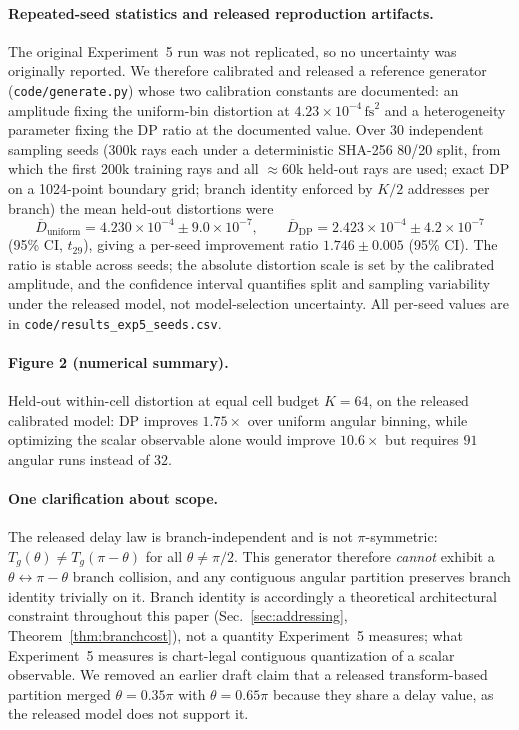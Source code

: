 \documentclass[11pt]{article}
\begin{document}
\paragraph{Repeated-seed statistics and released reproduction artifacts.}
The original Experiment~5 run was not replicated, so no uncertainty was originally
reported. We therefore calibrated and released a reference generator
(\texttt{code/generate.py}) whose two calibration constants are documented: an
amplitude fixing the uniform-bin distortion at $4.23\times10^{-4}\,\mathrm{fs}^2$ and a
heterogeneity parameter fixing the DP ratio at the documented value. Over $30$
independent sampling seeds (300k rays each under a deterministic SHA-256 80/20 split,
from which the first 200k training rays and all $\approx60$k held-out rays are used; exact
DP on a 1024-point boundary grid; branch identity enforced by $K/2$ addresses per
branch) the mean held-out distortions were
\begin{equation}
\overline{D}_{\mathrm{uniform}} = 4.230\times10^{-4} \pm 9.0\times10^{-7},
\qquad
\overline{D}_{\mathrm{DP}} = 2.423\times10^{-4} \pm 4.2\times10^{-7}
\end{equation}
(95\% CI, $t_{29}$), giving a per-seed improvement ratio
$\mathbf{1.746 \pm 0.005}$ (95\% CI). The ratio is stable across seeds; the absolute
distortion scale is set by the calibrated amplitude, and the confidence interval
quantifies split and sampling variability under the released model, not model-selection
uncertainty. All per-seed values are in \texttt{code/results\_exp5\_seeds.csv}.

\paragraph{Figure 2 (numerical summary).} Held-out within-cell distortion at equal cell
budget $K=64$, on the released calibrated model: DP improves $1.75\times$ over uniform
angular binning, while optimizing the scalar observable alone would improve $10.6\times$
but requires $91$ angular runs instead of $32$.

\paragraph{One clarification about scope.} The released delay law is branch-independent
and is not $\pi$-symmetric: $T_g(\theta) \neq T_g(\pi - \theta)$ for all
$\theta \neq \pi/2$. This generator therefore \emph{cannot} exhibit a
$\theta \leftrightarrow \pi-\theta$ branch collision, and any contiguous angular
partition preserves branch identity trivially on it. Branch identity is accordingly a
theoretical architectural constraint throughout this paper
(Sec.~\ref{sec:addressing}, Theorem~\ref{thm:branchcost}), not a quantity Experiment~5 measures; what Experiment~5
measures is chart-legal contiguous quantization of a scalar observable. We removed an
earlier draft claim that a released transform-based partition merged
$\theta = 0.35\pi$ with $\theta = 0.65\pi$ because they share a delay value, as the
released model does not support it.
\end{document}
